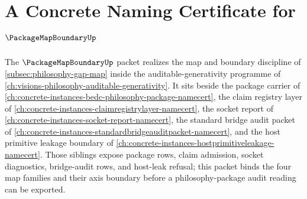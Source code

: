 \chapter{A Concrete Naming Certificate for $\PackageMapBoundaryUp$}
\label{ch:concrete-instances-packagemapboundary-namecert}

The $\PackageMapBoundaryUp$ packet realizes the map and boundary discipline of \autoref{subsec:philosophy-gap-map} inside the auditable-generativity programme of \autoref{ch:visions-philosophy-auditable-generativity}. It sits beside the package carrier of \autoref{ch:concrete-instances-bedc-philosophy-package-namecert}, the claim registry layer of \autoref{ch:concrete-instances-claimregistrylayer-namecert}, the socket report of \autoref{ch:concrete-instances-socket-report-namecert}, the standard bridge audit packet of \autoref{ch:concrete-instances-standardbridgeauditpacket-namecert}, and the host primitive leakage boundary of \autoref{ch:concrete-instances-hostprimitiveleakage-namecert}. Those siblings expose package rows, claim admission, socket diagnostics, bridge-audit rows, and host-leak refusal; this packet binds the four map families and their axis boundary before a philosophy-package audit reading can be exported.

